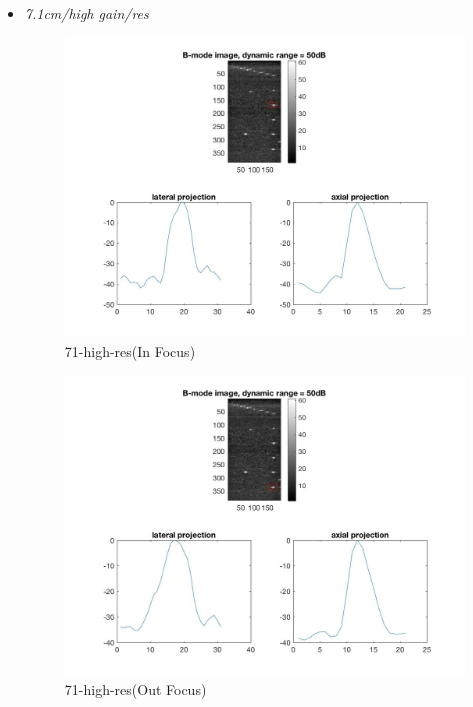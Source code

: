 \documentclass[12pts,a4paper]{article}
\begin{document}
\begin{itemize}
\item{\emph{7.1cm/high gain/res}}
\begin{center}
\end{center}
\begin{figure}[h]
    \centering
    \includegraphics[width=1.0\textwidth]{img_hw1/71-high-res1.jpg}
    \caption{71-high-res(In Focus)}
    \label{fig:mesh1}
\end{figure}
\pagebreak
\begin{figure}[h]
    \centering
    \includegraphics[width=1.0\textwidth]{img_hw1/71-high-res2.jpg}
    \caption{71-high-res(Out Focus)}
    \label{fig:mesh1}
\end{figure}
\pagebreak

\end{itemize}
\end{document}
